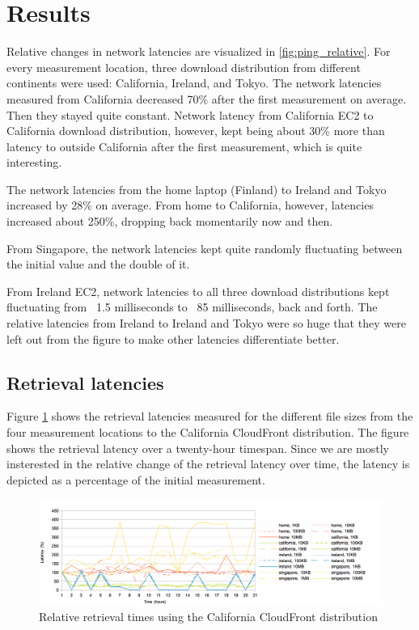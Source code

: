 \documentclass[conference]{IEEEtran}
\begin{document}
\section{Results}
Relative changes in network latencies are visualized in \autoref{fig:ping_relative}. For every measurement location, three download distribution from different continents were used: California, Ireland, and Tokyo. The network latencies measured from California decreased 70\% after the first measurement on average. Then they stayed quite constant. Network latency from California EC2 to California download distribution, however, kept being about 30\% more than latency to outside California after the first measurement, which is quite interesting.

The network latencies from the home laptop (Finland) to Ireland and Tokyo increased by 28\% on average. From home to California, however, latencies increased about 250\%, dropping back momentarily now and then.

From Singapore, the network latencies kept quite randomly fluctuating between the initial value and the double of it.

From Ireland EC2, network latencies to all three download distributions kept fluctuating from ~1.5 milliseconds to ~85 milliseconds, back and forth. The relative latencies from Ireland to Ireland and Tokyo were so huge that they were left out from the figure to make other latencies differentiate better.\\

\subsection{Retrieval latencies}
Figure \ref{fig:california_relative} shows the retrieval latencies measured for the different file sizes from the four measurement locations to the California CloudFront distribution. The figure shows the retrieval latency over a twenty-hour timespan. Since we are mostly insterested in the relative change of the retrieval latency over time, the latency is depicted as a percentage of the initial measurement.





\begin{figure}[]
    \centering
    \includegraphics[width=\linewidth]{images/california_relative.png}
    \caption[]{Relative retrieval times using the California CloudFront distribution}
    \label{fig:california_relative}
\end{figure}
\end{document}
